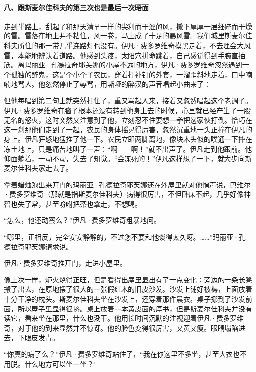 \paragraph*{八、跟斯麦尔佳科夫的第三次也是最后一次晤面}
\par 走到半路上，刮起了和那天清早一样的尖利而干涩的风，撒下厚厚一层细碎而干燥的雪。雪落在地上并不粘住，风一卷，马上成了十足的暴风雪。我们城里斯麦尔佳科夫所住的那一带几乎连路灯也没有。伊凡·费多罗维奇摸黑走着，不去理会大风雪，本能地辨认着道路。他感到头疼，太阳穴拼命跳着，自己感觉得到手腕直抽筋。离玛丽亚·孔德拉奇耶芙娜的小屋不远的地方，伊凡·费多罗维奇忽然遇到一个孤独的醉鬼，这是个小个子农民，穿着打补钉的外套，一溜歪斜地走着，口中喃喃地骂人。他忽然停止了辱骂，用嘶哑的醉汉的声音唱起小曲来了：
\par 但他每唱到第二句上就突然打住了，重又骂起人来，接着又忽然唱起这个老调子。伊凡·费多罗维奇在脑子根本还没有转到他身上去的时候，心里就已经产生了一股无名的怒火，这时突然又注意到了他，立刻忍不住要想一拳把这家伙打倒。恰巧在这一刹那他们走到了一起，农民的身体摇晃得厉害，忽然沉重地一头正撞在伊凡的身上。伊凡狂怒地猛推了他一下。农民立即两脚离地，像块木头似的噗通一下摔在冻土地上，只是痛苦地叫了一声：“啊——啊！”就不出声了。伊凡走到他跟前。他仰面躺着，一动不动，失去了知觉。“会冻死的！”伊凡这样想了一下，就大步向斯麦尔佳科夫家走去了。
\par 拿着蜡烛跑出来开门的玛丽亚·孔德拉奇耶芙娜还在外屋里就对他悄声说，巴维尔·费多罗维奇（那就是指斯麦尔佳科夫）病得很厉害，不但卧床不起，几乎好像神智也失了常，甚至吩咐把茶也拿走，不想喝。
\par “怎么，他还动蛮么？”伊凡·费多罗维奇粗暴地问。
\par “哪里，正相反，完全安安静静的，不过您不要和他谈得太久呀。……”玛丽亚·孔德拉奇耶芙娜请求说。
\par 伊凡·费多罗维奇推开门，走进小屋里。
\par 像上次一样，炉火烧得正旺，但是看得出屋里显出有了一点变化：旁边的一条长凳搬了出去，在原地摆了很大的一张假红木的旧皮沙发。沙发上铺好被褥，上面放着十分干净的枕头。斯麦尔佳科夫坐在沙发上，还穿着那件晨衣。桌子挪到了沙发前面，所以屋子里显得很挤。桌上放着一本黄皮面的厚书，但是斯麦尔佳科夫并没有读它，看来坐在那里，什么也没干。他用长时间沉默的注视迎着伊凡·费多罗维奇，对于他的到来显然并不惊讶。他的脸色变得很厉害，又黄又瘦。眼睛塌陷进去，下眼皮发青。
\par “你真的病了么？”伊凡·费多罗维奇站住了，“我在你这里不多坐，甚至大衣也不用脱。什么地方可以坐一坐？”
